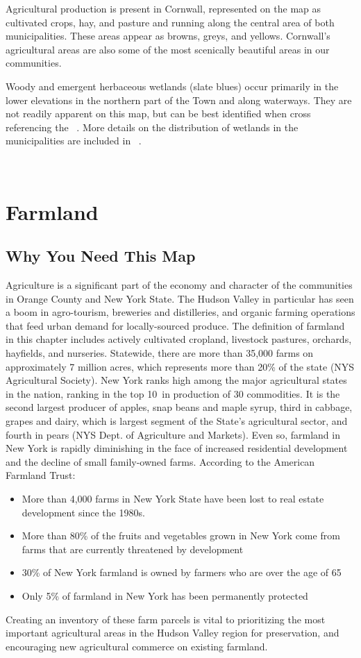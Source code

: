 Agricultural production is present in Cornwall, represented on the map as 
cultivated crops, hay, and pasture and running along the central area of both 
municipalities. These areas appear as browns, greys, and yellows. Cornwall's 
agricultural areas are also some of the most scenically beautiful areas in our 
communities. 
\par
Woody and emergent herbaceous wetlands (slate blues) occur primarily in the 
lower elevations in the northern part of the Town and along waterways. They are 
not readily apparent on this map, but can be best identified when cross 
referencing the ~. More details on the distribution 
of wetlands in the municipalities are included in ~.


~\label{map:landcover}
\section{Farmland}\label{subsec:farmland}
\subsection*{Why You Need This Map}
Agriculture is a significant part of the economy and character of the
communities in Orange County and New York State. The Hudson Valley in
particular has seen a boom in agro-tourism, breweries and distilleries, and
organic farming operations that feed urban demand for locally-sourced produce.
The definition of farmland in this chapter includes actively cultivated
cropland, livestock pastures, orchards, hayfields, and nurseries. Statewide,
there are more than 35,000 farms on approximately 7 million acres, which
represents more than 20\% of the state (NYS Agricultural Society). New York
ranks high among the major agricultural states in the nation, ranking in the
top 10\ in production of 30 commodities. It is the second largest producer of
apples, snap beans and maple syrup, third in cabbage, grapes and dairy, which
is largest segment of the State's agricultural sector, and fourth in pears (NYS
Dept. of Agriculture and Markets). Even so, farmland in New York is rapidly
diminishing in the face of increased residential development and the decline of
small family-owned farms. According to the American Farmland Trust:
\begin{itemize}
    \item More than 4,000 farms in New York State have been lost to real estate
    development since the 1980s.
    \item More than 80\% of the fruits and vegetables grown in New York come 
    from farms that are currently threatened by development
    \item 30\% of New York farmland is owned by farmers who are over the age of 
    65
    \item Only 5\% of farmland in New York has been permanently protected
\end{itemize}
Creating an inventory of these farm parcels is vital to prioritizing the most 
important agricultural areas in the Hudson Valley region for preservation, and 
encouraging new agricultural commerce on existing farmland.

